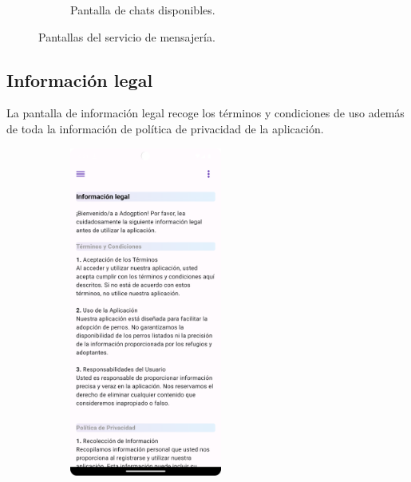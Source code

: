 \documentclass[a4paper, 12pt]{article}
\begin{document}
\begin{figure}[H]
\begin{subfigure}{0.48\textwidth}
\begin{center}
			\caption{Pantalla de chats disponibles.}
		\end{center}  
	\end{subfigure}\hfill
	\caption{Pantallas del servicio de mensajería.}
\end{figure}



\newpage
\subsection*{Información legal}

La pantalla de información legal recoge los términos y condiciones de uso además de toda la información de política de privacidad de la aplicación.

\begin{figure}[H]
   	\begin{subfigure}{0.48\textwidth}
		\begin{center}
			{\includegraphics[width=5cm]{app/LegalPage.png}\par}
		\end{center}  
	\end{subfigure}\hfill
   	\begin{subfigure}{0.48\textwidth}
		\begin{center}

\end{center}
\end{subfigure}
\end{figure}
\end{document}

